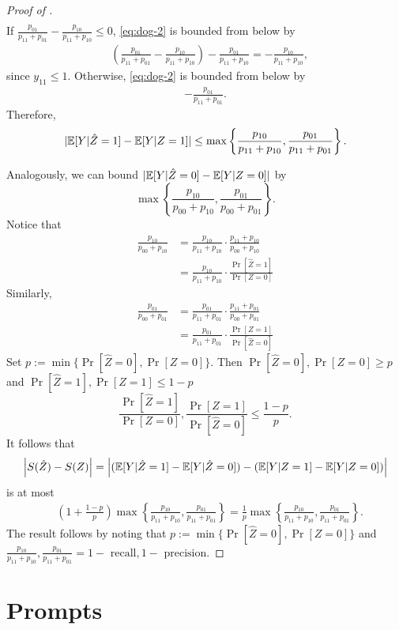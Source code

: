 \begin{proof}[Proof of ]
\begin{align}
\end{align}
If $\frac{p_{01}}{p_{11}+p_{01}} - \frac{p_{10}}{p_{11}+p_{10}} \le 0$, \eqref{eq:dog-2} is bounded from below by
\begin{align}
    &\left(\frac{p_{01}}{p_{11}+p_{01}} - \frac{p_{10}}{p_{11}+p_{10}}\right) - \frac{p_{01}}{p_{11} + p_{10}}
    = -\frac{p_{10}}{p_{11}+p_{10}},
\end{align}
since $y_{11} \le 1.$ Otherwise, \eqref{eq:dog-2}  is bounded from below by
\begin{align}
    -\frac{p_{01}}{p_{11}+p_{01}}.
\end{align}
Therefore, 
\begin{equation}
    |\mathbb{E}[Y|\hat{Z}=1] - \mathbb{E}[Y|Z=1]|\le \max\left\{\frac{p_{10}}{p_{11} + p_{10}}, \frac{p_{01}}{p_{11} + p_{01}}\right\}.
\end{equation}




Analogously, we can bound $|\mathbb{E}[Y|\hat{Z}=0] - \mathbb{E}[Y|Z=0]|$ by 
\begin{equation}
    \max\left\{\frac{p_{10}}{p_{00} + p_{10}}, \frac{p_{01}}{p_{00} + p_{01}}\right\}.
\end{equation}
Notice that
\begin{align}
    \frac{p_{10}}{p_{00} + p_{10}} &= \frac{p_{10}}{p_{11}+p_{10}}\cdot \frac{p_{11}+p_{10}}{p_{00} + p_{10}}\\
    &=\frac{p_{10}}{p_{11}+p_{10}}\cdot \frac{\Pr[\hat{Z}=1]}{\Pr[Z=0]}
\end{align}
Similarly,
\begin{align}
    \frac{p_{01}}{p_{00} + p_{01}} &= \frac{p_{01}}{p_{11}+p_{01}}\cdot \frac{p_{11}+p_{01}}{p_{00} + p_{01}}\\
    &=\frac{p_{01}}{p_{11}+p_{01}}\cdot \frac{\Pr[Z=1]}{\Pr[\hat{Z}=0]}
\end{align}
Set $p:=\min\{\Pr[\hat{Z}=0], \Pr[Z=0]\}$. Then $\Pr[\hat{Z}=0], \Pr[Z=0]\ge p$ and $\Pr[\hat{Z}=1], \Pr[Z=1]\le 1-p$
\begin{equation}
    \frac{\Pr[\hat{Z}=1]}{\Pr[Z=0]}, \frac{\Pr[Z=1]}{\Pr[\hat{Z}=0]} \le \frac{1-p}{p}. 
\end{equation}
It follows that
\begin{equation}
    \left|S(\hat{Z}) - S(Z)\right| = \left|(\mathbb{E}[Y|\hat{Z}=1] - \mathbb{E}[Y|\hat{Z}=0]) - (\mathbb{E}[Y|Z=1] - \mathbb{E}[Y|Z=0])\right|
\end{equation}
is at most
\begin{align}
    &\left(1 + \frac{1-p}{p}\right)\max\left\{\frac{p_{10}}{p_{11}+p_{10}}, \frac{p_{01}}{p_{11}+p_{01}}\right\}
    = \frac{1}{p}\max\left\{\frac{p_{10}}{p_{11}+p_{10}}, \frac{p_{01}}{p_{11}+p_{01}}\right\}.
\end{align}
The result follows by noting that $p:=\min\{\Pr[\hat{Z}=0], \Pr[Z=0]\}$ and $\frac{p_{10}}{p_{11}+p_{10}}, \frac{p_{01}}{p_{11}+p_{01}} = 1 - \text{ recall}, 1 - \text{ precision}.$
\end{proof}

\section{Prompts}





